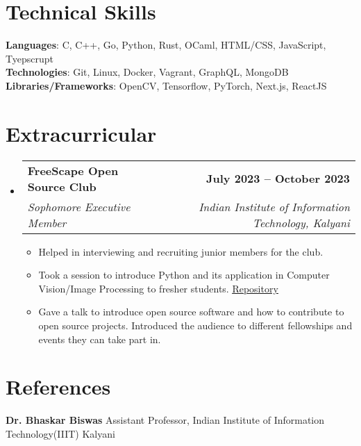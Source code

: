 \documentclass[letterpaper,11pt]{article}
\makeatletter
\newcommand{\resumeItem}[1]{
  \item\small{
    {#1 \vspace{-2pt}}
  }
}
\newcommand{\resumeSubheading}[4]{
  \vspace{-2pt}\item
    \begin{tabular*}{1.0\textwidth}[t]{l@{\extracolsep{\fill}}r}
      \textbf{#1} & \textbf{\small #2} \\
      \textit{\small#3} & \textit{\small #4} \\
    \end{tabular*}\vspace{-7pt}
}
\newcommand{\resumeSubHeadingListStart}{\begin{itemize}[leftmargin=0.0in, label={}]}
\newcommand{\resumeSubHeadingListEnd}{\end{itemize}}
\newcommand{\resumeItemListStart}{\begin{itemize}}
\newcommand{\resumeItemListEnd}{\end{itemize}\vspace{-5pt}}
\makeatother
\begin{document}
\section{Technical Skills}
 \begin{itemize}[leftmargin=0.15in, label={}]
    \small{\item{
     \textbf{Languages}{: C, C++, Go, Python, Rust, OCaml, HTML/CSS, JavaScript, Tyepscrupt} \\
     \textbf{Technologies}{: Git, Linux, Docker, Vagrant, GraphQL, MongoDB} \\
     \textbf{Libraries/Frameworks}{: OpenCV, Tensorflow, PyTorch, Next.js, ReactJS}
    }}
 \end{itemize}
 \vspace{-16pt}
\section{Extracurricular}
    \resumeSubHeadingListStart
        \resumeSubheading{FreeScape Open Source Club}{July 2023 -- October 2023}{Sophomore Executive Member}{Indian Institute of Information Technology, Kalyani}
            \resumeItemListStart
                \resumeItem{Helped in interviewing and recruiting junior members for the club.}
                \resumeItem{Took a session to introduce Python and its application in Computer Vision/Image Processing to fresher students. \href{https://github.com/MashyBasker/invcloak}{\underline{Repository}}}
                \resumeItem{Gave a talk to introduce open source software and how to contribute to open source projects. Introduced the audience to different fellowships and events they can take part in.}
            \resumeItemListEnd
    \resumeSubHeadingListEnd
\section{References}
\textbf{Dr. Bhaskar Biswas} Assistant Professor, Indian Institute of Information Technology(IIIT) Kalyani
\end{document}
